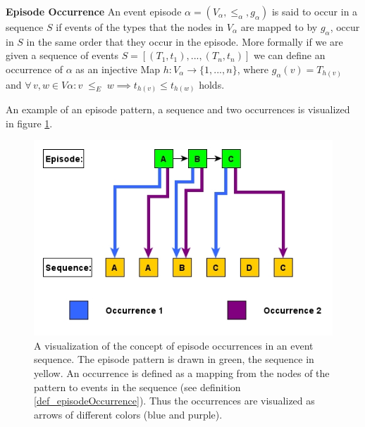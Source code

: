 \begin{mydef}
\label{def_episodeOccurrence}
\textbf{Episode Occurrence} An event episode $\alpha = (V_\alpha,{\leq}_{\alpha},g_\alpha)$ is said to occur in a sequence $S$ if events of the types that the nodes in $V_\alpha$ are mapped to by $g_\alpha$, occur in $S$ in the same order that they occur in the episode. More formally if we are given a sequence of events $S=[(T_1,t_1),...,(T_n,t_n)]$ we can define an occurrence of $\alpha$ as an injective Map $h:V_\alpha \rightarrow \{1,...,n\}$, where $g_\alpha (v) = T_{h(v)}$ and $\forall \, v,w \in V\alpha : v \;{\leq}_{E}\; w \implies t_{h(v)} \le t_{h(w)}$ holds. \cite{mannila1995discovering}
\end{mydef}

An example of an episode pattern, a sequence and two occurrences is visualized in figure \ref{fig_occurrenceExample}.

\begin{figure}[h]
	\centering
  	\includegraphics[width=\textwidth]{occurrenceExample}
	\caption{A visualization of the concept of episode occurrences in an event sequence. The episode pattern is drawn in green, the sequence in yellow. An occurrence is defined as a mapping from the nodes of the pattern to events in the sequence (see definition \ref{def_episodeOccurrence}). Thus the occurrences are visualized as arrows of different colors (blue and purple). }
	\label{fig_occurrenceExample}
\end{figure}


